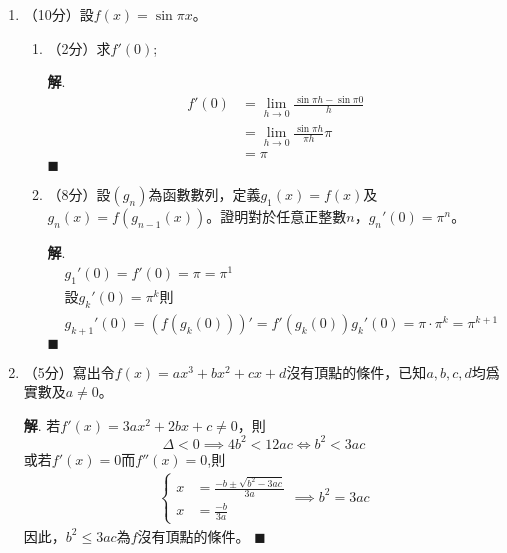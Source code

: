 \documentclass[12pt]{article}
\newenvironment*{sol}{\par \textbf{解}.}{\hfill$\blacksquare$}
\begin{document}
    \begin{enumerate}
        \item （10分）設$f(x)=\sin{\pi x}$。\begin{enumerate}
            \item （2分）求$f'(0)$;\begin{sol}
                \begin{align*}
                    f'(0)&=\lim_{h\to 0}\frac{\sin{\pi h}-\sin{\pi 0}}{h}\\
                    &=\lim_{h\to 0}\frac{\sin{\pi h}}{\pi h}\pi\\
                    &=\pi
                \end{align*}
            \end{sol}
            \item （8分）設$(g_n)$為函數數列，定義$g_1(x)=f(x)$及$g_n(x)=f(g_{n-1}(x))$。證明對於任意正整數$n$，$g_n'(0)=\pi^n$。\begin{sol}
                \begin{align*}
                    &g_1'(0)=f'(0)=\pi=\pi^1\\
                    &\textrm{設}g_k'(0)=\pi^k\textrm{則}\\
                    &g_{k+1}'(0)=(f(g_k(0)))'=f'(g_k(0))g_k'(0)=\pi\cdot\pi^k=\pi^{k+1}
                \end{align*}
            \end{sol}
        \end{enumerate}
        \item （5分）寫出令$f(x)=ax^3+bx^2+cx+d$沒有頂點的條件，已知$a,b,c,d$均爲實數及$a\neq 0$。\begin{sol}
            若$f'(x)=3ax^2+2bx+c\neq 0$，則$$\Delta<0\implies 4b^2<12ac\iff b^2<3ac$$
            或若$f'(x)=0$而$f''(x)=0$,則\begin{align*}
                \begin{cases}
                    x&=\frac{-b\pm\sqrt{b^2-3ac}}{3a}\\
                    x&=\frac{-b}{3a}
                \end{cases}\implies b^2=3ac
            \end{align*}
            因此，$b^2\leq 3ac$為$f$沒有頂點的條件。
        \end{sol}
    \end{enumerate}
\end{document}
